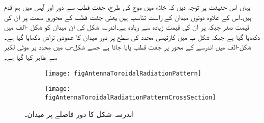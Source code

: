 یہاں اس حقیقت پر توجہ دیں کہ خلاء میں  موج کی طرح، جفت قطب سے دور  اور   آپس میں ہم قدم ہیں۔اس کے علاوہ دونوں میدان   کے راست تناسب ہیں یعنی جفت قطب کے محوری سمت  پر ان کی قیمت صفر جبکہ  پر ان کی قیمت زیادہ سے زیادہ ہے۔اندرسہ شکل کی ان میدان کو شکل -الف میں دکھایا گیا ہے جبکہ شکل-ب میں  کارتیسی  محدد کی سطح  پر دور میدان کا عمودی تراش دکھایا گیا ہے۔شکل-الف میں اندرسے کے محور پر جفت قطب پایا جاتا ہے جسے شکل-ب میں  محدد پر موٹی لکیر سے ظاہر کیا گیا ہے۔ 

\begin{figure}
\centering
\begin{subfigure}{0.5\textwidth}
\centering
\texttt{[image: figAntennaToroidalRadiationPattern]}
\caption{}
\end{subfigure}%
%
\begin{subfigure}{0.5\textwidth}
\centering
\texttt{[image: figAntennaToroidalRadiationPatternCrossSection]}
\caption{}
\end{subfigure}%
\caption{اندرسہ شکل کا دور فاصلے پر میدان۔}
\label{شکل_اینٹینا_اندرسہ_دور_میدان}
\end{figure}


